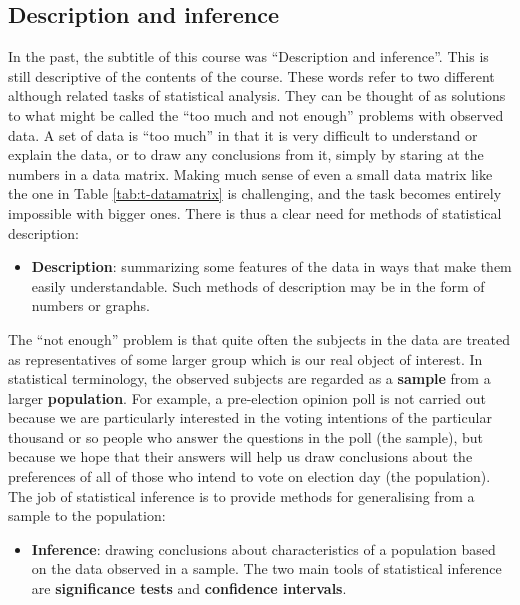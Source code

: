 \documentclass[11pt,a4paper,openany]{book}
\providecommand{\tightlist}{%
  \setlength{\itemsep}{0pt}\setlength{\parskip}{0pt}}
\begin{document}
\subsection{Description and inference}\label{ss-intro-def-descr}

In the past, the subtitle of this course was ``Description and
inference''. This is still descriptive of the contents of the course.
These words refer to two different although related tasks of statistical
analysis. They can be thought of as solutions to what might be called
the ``too much and not enough'' problems with observed data. A set of
data is ``too much'' in that it is very difficult to understand or
explain the data, or to draw any conclusions from it, simply by staring
at the numbers in a data matrix. Making much sense of even a small data
matrix like the one in Table \ref{tab:t-datamatrix} is challenging, and
the task becomes entirely impossible with bigger ones. There is thus a
clear need for methods of statistical description:

\begin{itemize}
\tightlist
\item
  \textbf{Description}: summarizing some features of the data in ways
  that make them easily understandable. Such methods of description may
  be in the form of numbers or graphs.
\end{itemize}

The ``not enough'' problem is that quite often the subjects in the data
are treated as representatives of some larger group which is our real
object of interest. In statistical terminology, the observed subjects
are regarded as a \textbf{sample} from a larger \textbf{population}. For
example, a pre-election opinion poll is not carried out because we are
particularly interested in the voting intentions of the particular
thousand or so people who answer the questions in the poll (the sample),
but because we hope that their answers will help us draw conclusions
about the preferences of all of those who intend to vote on election day
(the population). The job of statistical inference is to provide methods
for generalising from a sample to the population:

\begin{itemize}
\tightlist
\item
  \textbf{Inference}: drawing conclusions about characteristics of a
  population based on the data observed in a sample. The two main tools
  of statistical inference are \textbf{significance tests} and
  \textbf{confidence intervals}.
\end{itemize}
\end{document}
